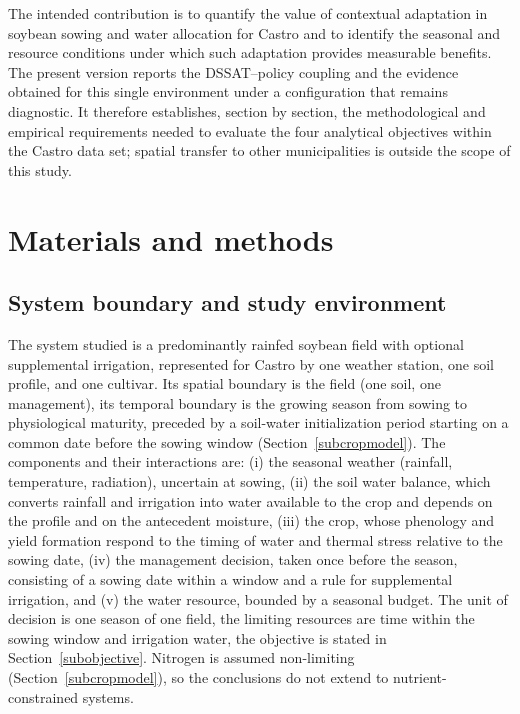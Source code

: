 \documentclass[times,final,authoryear]{elsarticle}
\begin{document}
The intended contribution is to quantify the value of contextual adaptation in soybean sowing and water allocation for Castro and to identify the seasonal and resource conditions under which such adaptation provides measurable benefits. The present version reports the DSSAT--policy coupling and the evidence obtained for this single environment under a configuration that remains diagnostic. It therefore establishes, section by section, the methodological and empirical requirements needed to evaluate the four analytical objectives within the Castro data set; spatial transfer to other municipalities is outside the scope of this study.


\section{Materials and methods}
\label{metodologia}



\subsection{System boundary and study environment}
\label{subsystem}

The system studied is a predominantly rainfed soybean field with optional supplemental irrigation, represented for Castro by one weather station, one soil profile, and one cultivar. Its spatial boundary is the field (one soil, one management), its temporal boundary is the growing season from sowing to physiological maturity, preceded by a soil-water initialization period starting on a common date before the sowing window (Section~\ref{subcropmodel}). The components and their interactions are: (i) the seasonal weather (rainfall, temperature, radiation), uncertain at sowing, (ii) the soil water balance, which converts rainfall and irrigation into water available to the crop and depends on the profile and on the antecedent moisture, (iii) the crop, whose phenology and yield formation respond to the timing of water and thermal stress relative to the sowing date, (iv) the management decision, taken once before the season, consisting of a sowing date within a window and a rule for supplemental irrigation, and (v) the water resource, bounded by a seasonal budget. The unit of decision is one season of one field, the limiting resources are time within the sowing window and irrigation water, the objective is stated in Section~\ref{subobjective}. Nitrogen is assumed non-limiting (Section~\ref{subcropmodel}), so the conclusions do not extend to nutrient-constrained systems.
\end{document}
